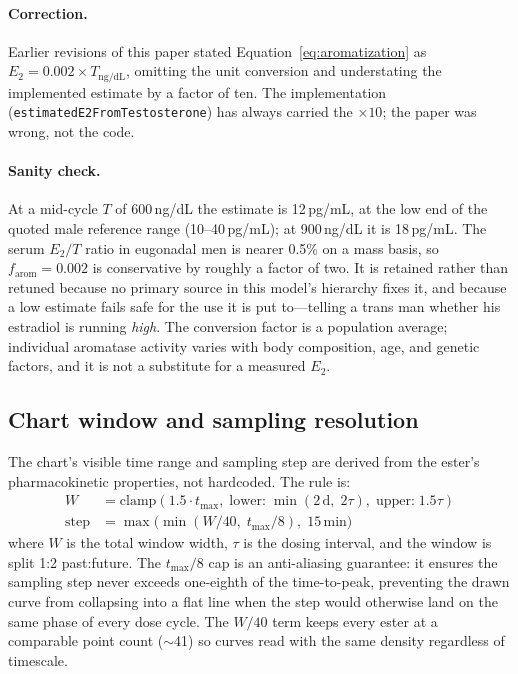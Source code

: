 \documentclass[11pt,a4paper]{article}
\newcommand{\code}[1]{\texttt{\small #1}}
\begin{document}
\paragraph{Correction.} Earlier revisions of this paper stated
Equation~\ref{eq:aromatization} as $E_2 = 0.002 \times T_{\text{ng/dL}}$,
omitting the unit conversion and understating the implemented estimate by a
factor of ten. The implementation
(\code{estimatedE2FromTestosterone}) has always carried the $\times 10$; the
paper was wrong, not the code.

\paragraph{Sanity check.} At a mid-cycle $T$ of 600\,ng/dL the estimate is
12\,pg/mL, at the low end of the quoted male reference range
(10--40\,pg/mL); at 900\,ng/dL it is 18\,pg/mL. The serum $E_2/T$ ratio in
eugonadal men is nearer 0.5\% on a mass basis, so $f_{\text{arom}} = 0.002$
is conservative by roughly a factor of two. It is retained rather than
retuned because no primary source in this model's hierarchy fixes it, and
because a low estimate fails safe for the use it is put to---telling a trans
man whether his estradiol is running \emph{high}. The conversion factor is a
population average; individual aromatase activity varies with body
composition, age, and genetic factors, and it is not a substitute for a
measured $E_2$.

\subsection{Chart window and sampling resolution}
\label{sec:chart_window}

The chart's visible time range and sampling step are derived from the
ester's pharmacokinetic properties, not hardcoded. The rule is:
\begin{align}
W    &= \mathrm{clamp}(1.5 \cdot t_{\max},\; \text{lower:}\;\min(2\,\text{d},\; 2\tau),\; \text{upper:}\;1.5\tau) \label{eq:window} \\
\text{step} &= \max\bigl(\min(W/40,\; t_{\max}/8),\; 15\,\text{min}\bigr) \label{eq:step}
\end{align}
where $W$ is the total window width, $\tau$ is the dosing interval, and
the window is split 1:2 past:future. The $t_{\max}/8$ cap is an
anti-aliasing guarantee: it ensures the sampling step never exceeds
one-eighth of the time-to-peak, preventing the drawn curve from
collapsing into a flat line when the step would otherwise land on the
same phase of every dose cycle. The $W/40$ term keeps every ester at a
comparable point count ($\sim$41) so curves read with the same density
regardless of timescale.
\end{document}
